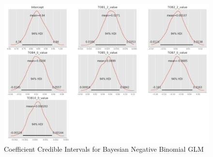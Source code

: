 \documentclass{article}
\begin{document}
\begin{figure}
\centering
\includegraphics[width=1.0\textwidth]{nb_pos.png}
\caption{Coefficient Credible Intervals for Bayesian Negative Binomial GLM}
\label{fig:figure19}
\end{figure}
\end{document}
